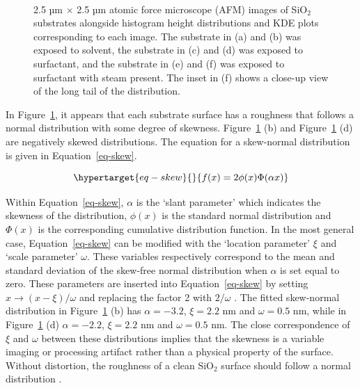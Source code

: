 \documentclass[
  a4paper,
]{scrbook}
\begin{document}
\begin{figure}
\begin{minipage}[t]{0.45\linewidth}
{{}

}

\end{minipage}%
%
\begin{minipage}[t]{0.01\linewidth}

{\centering 

~

}

\end{minipage}%

\caption{\label{fig-afm-substrate}2.5 µm \(\times\) 2.5 µm atomic force
microscope (AFM) images of SiO\(_2\) substrates alongside histogram
height distributions and KDE plots corresponding to each image. The
substrate in (a) and (b) was exposed to solvent, the substrate in (c)
and (d) was exposed to surfactant, and the substrate in (e) and (f) was
exposed to surfactant with steam present. The inset in (f) shows a
close-up view of the long tail of the distribution.}

\end{figure}

In Figure~\ref{fig-afm-substrate}, it appears that each substrate
surface has a roughness that follows a normal distribution with some
degree of skewness. Figure~\ref{fig-afm-substrate} (b) and
Figure~\ref{fig-afm-substrate} (d) are negatively skewed distributions.
The equation for a skew-normal distribution is given in
Equation~\ref{eq-skew}.

\begin{equation}\protect\hypertarget{eq-skew}{}{
f(x) = 2\phi(x)\Phi(\alpha x)
}\label{eq-skew}\end{equation}

Within Equation~\ref{eq-skew}, \(\alpha\) is the `slant parameter' which
indicates the skewness of the distribution, \(\phi(x)\) is the standard
normal distribution and \(\Phi(x)\) is the corresponding cumulative
distribution function. In the most general case, Equation~\ref{eq-skew}
can be modified with the `location parameter' \(\xi\) and `scale
parameter' \(\omega\). These variables respectively correspond to the
mean and standard deviation of the skew-free normal distribution when
\(\alpha\) is set equal to zero. These parameters are inserted into
Equation~\ref{eq-skew} by setting \(x \rightarrow (x-\xi)/\omega\) and
replacing the factor 2 with \(2/\omega\) \autocite{Azzalini2013}. The
fitted skew-normal distribution in Figure~\ref{fig-afm-substrate} (b)
has \(\alpha = -3.2\), \(\xi = 2.2\) nm and \(\omega = 0.5\) nm, while
in Figure~\ref{fig-afm-substrate} (d) \(\alpha = -2.2\), \(\xi = 2.2\)
nm and \(\omega = 0.5\) nm. The close correspondence of \(\xi\) and
\(\omega\) between these distributions implies that the skewness is a
variable imaging or processing artifact rather than a physical property
of the surface. Without distortion, the roughness of a clean SiO\(_2\)
surface should follow a normal distribution \autocite{Velicky2015}.
\end{document}
